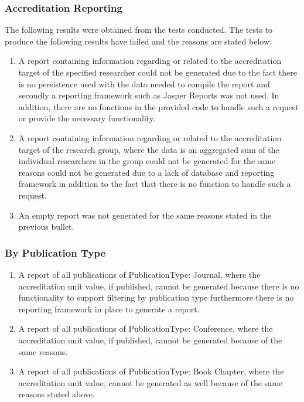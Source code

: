 \subsubsection{Accreditation Reporting}  
The following results were obtained from the tests conducted. The tests to produce the following results have failed and the reasons are stated below. 
\begin{enumerate}
	\item A report containing information regarding or related to the accreditation target of the specified researcher could not be generated due to the fact there is no persistence used with the data needed to compile the report and secondly a reporting framework such as Jasper Reports was not used. In addition, there are no functions in the provided code to handle such a request or provide the necessary functionality. 
	\item A report containing information regarding or related to the accreditation target of the research group, where the data is an aggregated sum of the individual researchers in the group could not be generated for the same reasons could not be generated due to a lack of database and reporting framework in addition to the fact that there is no function to handle such a request.
	\item An empty report was not generated for the same reasons stated in the previous bullet. 
\end{enumerate}

\subsubsection{By Publication Type}
\begin{enumerate}
	\item A report of all publications of PublicationType: Journal, where the accreditation unit value, if published, cannot be generated because there is no functionality to support filtering by publication type furthermore there is no reporting framework in place to generate a report.
	\item A report of all publications of PublicationType: Conference, where the accreditation unit value, if published, cannot be generated because of the same reasons.  
	\item A report of all publications of PublicationType: Book Chapter, where the accreditation unit value, cannot be generated as well because of the same reasons stated above.
\end{enumerate}


